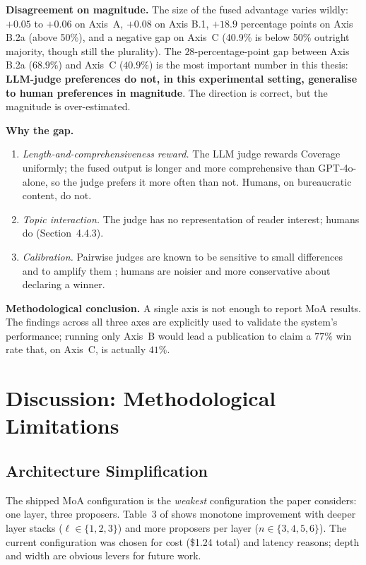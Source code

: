 \textbf{Disagreement on magnitude.} The size of the fused advantage
varies wildly: $+0.05$ to $+0.06$ on Axis~A, $+0.08$ on Axis B.1,
$+18.9$ percentage points on Axis B.2a (above 50\%), and a negative gap
on Axis~C (40.9\% is below 50\% outright majority, though still the plurality). The $28$-percentage-point gap between Axis B.2a
($68.9\%$) and Axis~C ($40.9\%$) is the most important number in this
thesis: \textbf{LLM-judge preferences do not, in this experimental
setting, generalise to human preferences in magnitude}. The
direction is correct, but the magnitude is over-estimated.

\textbf{Why the gap.}
\begin{enumerate}
  \item \textit{Length-and-comprehensiveness reward.} The LLM judge
        rewards Coverage uniformly; the fused output is longer and
        more comprehensive than GPT-4o-alone, so the judge prefers it
        more often than not. Humans, on bureaucratic content, do
        not.
  \item \textit{Topic interaction.} The judge has no representation
        of reader interest; humans do (Section~4.4.3).
  \item \textit{Calibration.} Pairwise judges are known to be
        sensitive to small differences and to amplify them
        \cite{Zheng2023}; humans are noisier and more conservative
        about declaring a winner.
\end{enumerate}

\textbf{Methodological conclusion.} A single axis is not enough to
report MoA results. The findings across all three axes are
explicitly used to validate the system's performance;
running only Axis~B would lead a publication to claim a $77\%$ win
rate that, on Axis~C, is actually $41\%$.

\section{Discussion: Methodological Limitations}

\subsection{Architecture Simplification}

The shipped MoA configuration is the \textit{weakest} configuration
the paper considers: one layer, three proposers. Table~3 of
\cite{Wang2024} shows monotone improvement with deeper layer stacks
($\ell \in \{1, 2, 3\}$) and more proposers per layer
($n \in \{3, 4, 5, 6\}$). The current configuration was chosen for
cost (\$1.24 total) and latency reasons; depth and width are obvious
levers for future work.

